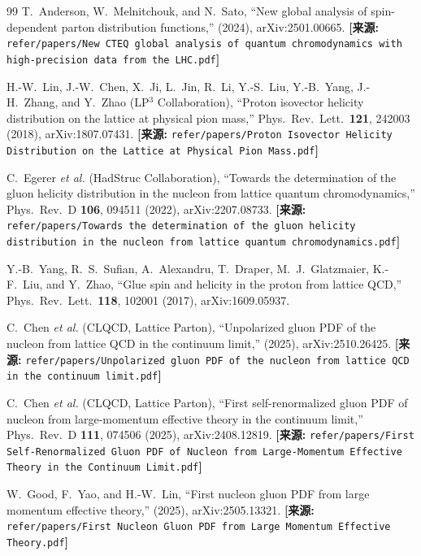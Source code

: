 \documentclass[12pt,a4paper]{ctexart}
\theoremstyle{definition}
\begin{document}
\begin{thebibliography}{99}
T.~Anderson, W.~Melnitchouk, and N.~Sato,
``New global analysis of spin-dependent parton distribution functions,''
(2024), arXiv:2501.00665.
\quad\textbf{[来源:} \texttt{refer/papers/New CTEQ global analysis of quantum chromodynamics with high-precision data from the LHC.pdf}\textbf{]}


H.-W.~Lin, J.-W.~Chen, X.~Ji, L.~Jin, R.~Li, Y.-S.~Liu, Y.-B.~Yang, J.-H.~Zhang, and Y.~Zhao (LP$^3$ Collaboration),
``Proton isovector helicity distribution on the lattice at physical pion mass,''
Phys.\ Rev.\ Lett.\ \textbf{121}, 242003 (2018), arXiv:1807.07431.
\quad\textbf{[来源:} \texttt{refer/papers/Proton Isovector Helicity Distribution on the Lattice at Physical Pion Mass.pdf}\textbf{]}


C.~Egerer \textit{et al.} (HadStruc Collaboration),
``Towards the determination of the gluon helicity distribution in the nucleon from lattice quantum chromodynamics,''
Phys.\ Rev.\ D \textbf{106}, 094511 (2022), arXiv:2207.08733.
\quad\textbf{[来源:} \texttt{refer/papers/Towards the determination of the gluon helicity distribution in the nucleon from lattice quantum chromodynamics.pdf}\textbf{]}

Y.-B.~Yang, R.~S.~Sufian, A.~Alexandru, T.~Draper, M.~J.~Glatzmaier, K.-F.~Liu, and Y.~Zhao,
``Glue spin and helicity in the proton from lattice QCD,''
Phys.\ Rev.\ Lett.\ \textbf{118}, 102001 (2017), arXiv:1609.05937.


C.~Chen \textit{et al.} (CLQCD, Lattice Parton),
``Unpolarized gluon PDF of the nucleon from lattice QCD in the continuum limit,''
(2025), arXiv:2510.26425.
\quad\textbf{[来源:} \texttt{refer/papers/Unpolarized gluon PDF of the nucleon from lattice QCD in the continuum limit.pdf}\textbf{]}

C.~Chen \textit{et al.} (CLQCD, Lattice Parton),
``First self-renormalized gluon PDF of nucleon from large-momentum effective theory in the continuum limit,''
Phys.\ Rev.\ D \textbf{111}, 074506 (2025), arXiv:2408.12819.
\quad\textbf{[来源:} \texttt{refer/papers/First Self-Renormalized Gluon PDF of Nucleon from Large-Momentum Effective Theory in the Continuum Limit.pdf}\textbf{]}

W.~Good, F.~Yao, and H.-W.~Lin,
``First nucleon gluon PDF from large momentum effective theory,''
(2025), arXiv:2505.13321.
\quad\textbf{[来源:} \texttt{refer/papers/First Nucleon Gluon PDF from Large Momentum Effective Theory.pdf}\textbf{]}


\end{thebibliography}
\end{document}

